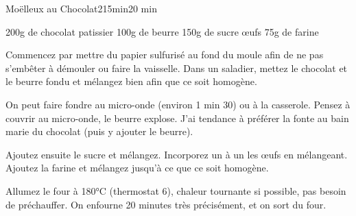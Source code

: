 \begin{recette}{Moëlleux au Chocolat}{2}{15min}{20 min}

\begin{ingredients}
\ingredient 200g de chocolat patissier
\ingredient 100g de beurre
\ingredient 150g de sucre
 œufs
\ingredient 75g de farine
\end{ingredients}

\begin{preparation}
\etape Commencez par mettre du papier sulfurisé au fond du moule afin de ne pas s'embêter à démouler ou faire la vaisselle. 
\etape Dans un saladier, mettez le chocolat et le beurre fondu et mélangez bien afin que ce soit homogène.
\begin{remarque}
On peut faire fondre au micro-onde (environ 1 min 30) ou à la casserole. Pensez à couvrir au micro-onde, le beurre explose. J'ai tendance à préférer la fonte au bain marie du chocolat (puis y ajouter le beurre).
\end{remarque}
\etape Ajoutez ensuite le sucre et mélangez.
\etape Incorporez un à un les œufs en mélangeant.
\etape Ajoutez la farine et mélangez jusqu'à ce que ce soit homogène. 
\end{preparation}

\begin{cuisson}
Allumez le four à 180°C (thermostat 6), chaleur tournante si possible, pas besoin de préchauffer. On enfourne 20 minutes très précisément, et on sort du four.
\end{cuisson}
\end{recette}

